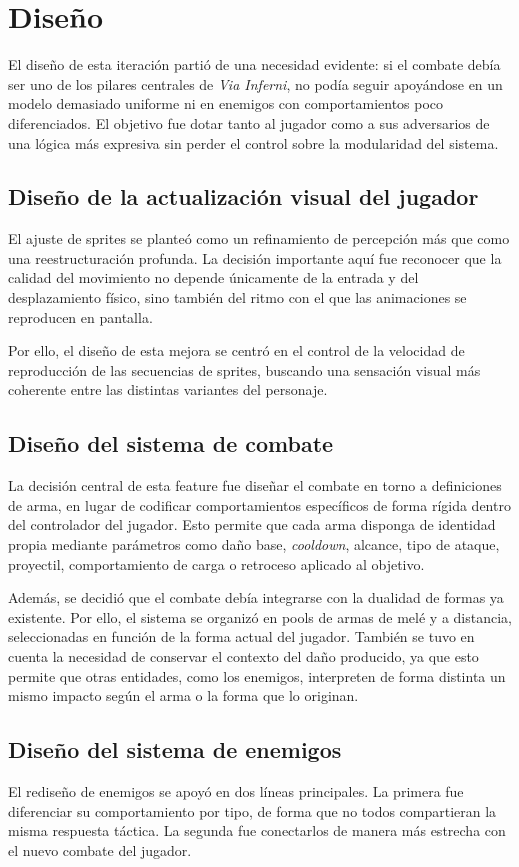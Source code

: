 \section{Diseño}
El diseño de esta iteración partió de una necesidad evidente: si el combate debía ser uno
de los pilares centrales de \textit{Via Inferni}, no podía seguir apoyándose en un modelo
demasiado uniforme ni en enemigos con comportamientos poco diferenciados. El objetivo fue
dotar tanto al jugador como a sus adversarios de una lógica más expresiva sin perder el
control sobre la modularidad del sistema.

\subsection{Diseño de la actualización visual del jugador}
El ajuste de sprites se planteó como un refinamiento de percepción más que como una
reestructuración profunda. La decisión importante aquí fue reconocer que la calidad del
movimiento no depende únicamente de la entrada y del desplazamiento físico, sino también del
ritmo con el que las animaciones se reproducen en pantalla.

Por ello, el diseño de esta mejora se centró en el control de la velocidad de reproducción
de las secuencias de sprites, buscando una sensación visual más coherente entre las
distintas variantes del personaje.

\subsection{Diseño del sistema de combate}
La decisión central de esta feature fue diseñar el combate en torno a definiciones de arma,
en lugar de codificar comportamientos específicos de forma rígida dentro del controlador del
jugador. Esto permite que cada arma disponga de identidad propia mediante parámetros como
daño base, \textit{cooldown}, alcance, tipo de ataque, proyectil, comportamiento de carga o
retroceso aplicado al objetivo.

Además, se decidió que el combate debía integrarse con la dualidad de formas ya existente.
Por ello, el sistema se organizó en pools de armas de melé y a distancia, seleccionadas en
función de la forma actual del jugador. También se tuvo en cuenta la necesidad de conservar
el contexto del daño producido, ya que esto permite que otras entidades, como los enemigos,
interpreten de forma distinta un mismo impacto según el arma o la forma que lo originan.

\subsection{Diseño del sistema de enemigos}
El rediseño de enemigos se apoyó en dos líneas principales. La primera fue diferenciar su
comportamiento por tipo, de forma que no todos compartieran la misma respuesta táctica. La
segunda fue conectarlos de manera más estrecha con el nuevo combate del jugador.

